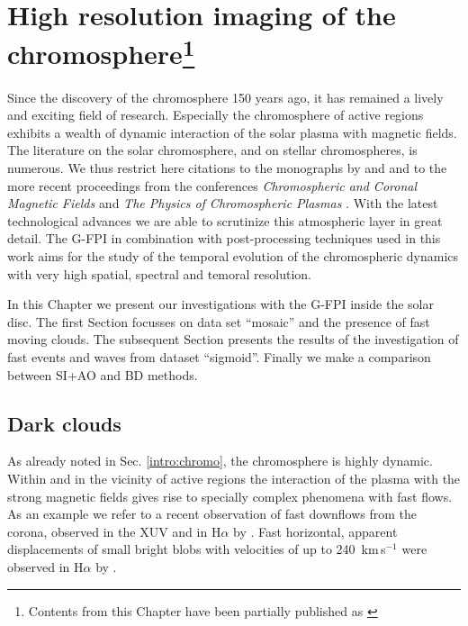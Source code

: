 \chapter[High resolution imaging of the chromosphere]{High resolution imaging of the chromosphere\label{chapter:hr}\Large{\protect\footnote{Contents from this Chapter have been partially published as \citet{2005ESASP.600E..70S,sanchez07}}}}

Since the discovery of the chromosphere 150 years ago, it has remained a lively and exciting field of research.  Especially the chromosphere of active regions exhibits a wealth of dynamic interaction of the solar plasma with magnetic fields. The literature on the solar chromosphere, and on stellar chromospheres, is numerous. We thus restrict here citations to the monographs by \citet{bray74} and \citet{athay76} and to the more recent proceedings from the conferences {\em Chromospheric and Coronal Magnetic Fields} \citep{2005ESASP.596.....I} and {\em The Physics of Chromospheric Plasmas} \citep{heinzel07}. With the latest technological advances we are able to scrutinize this atmospheric layer in great detail. The G-FPI in combination with post-processing techniques used in this work aims for the study of the temporal evolution  of the chromospheric dynamics with very high spatial, spectral and temoral resolution.

In this Chapter we present our investigations with the G-FPI inside the solar disc. The first Section focusses on data set ``mosaic'' and the presence of fast moving clouds. The subsequent Section presents the results of the investigation of fast events and waves from dataset ``sigmoid''. Finally we make a comparison between SI+AO and BD methods.

\section{Dark clouds\label{hr:darkclouds}}
As already noted in Sec. \ref{intro:chromo}, the chromosphere is highly dynamic. Within and in the vicinity of active regions the interaction of the plasma with the strong magnetic fields gives rise to specially complex phenomena with fast flows.  As an example we refer to a recent observation of fast downflows from the corona, observed in the XUV and in H$\alpha$ by \citet{2007A&A...472..633T}. Fast horizontal, apparent displacements of small bright blobs with velocities of up to 240~km\,s$^{-1}$ were observed in H$\alpha$ by \citet{2006ApJ...648L..67V}.

